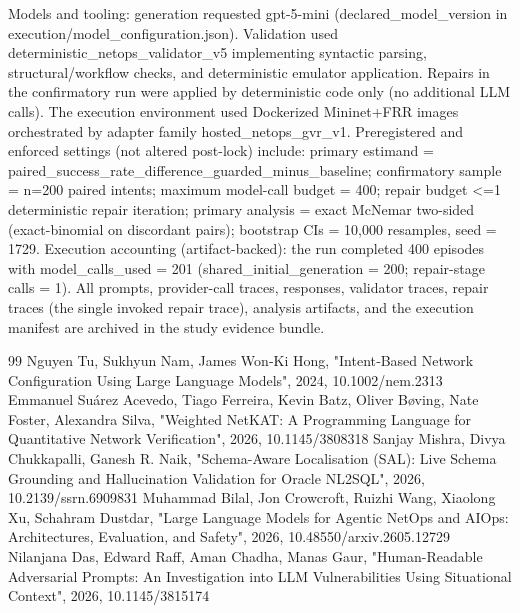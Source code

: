 \documentclass[conference]{IEEEtran}
\begin{document}
Models and tooling: generation requested gpt-5-mini (declared\_model\_version in execution/model\_configuration.json). Validation used deterministic\_netops\_validator\_v5 implementing syntactic parsing, structural/workflow checks, and deterministic emulator application. Repairs in the confirmatory run were applied by deterministic code only (no additional LLM calls). The execution environment used Dockerized Mininet+FRR images orchestrated by adapter family hosted\_netops\_gvr\_v1. Preregistered and enforced settings (not altered post-lock) include: primary estimand = paired\_success\_rate\_difference\_guarded\_minus\_baseline; confirmatory sample = n=200 paired intents; maximum model-call budget = 400; repair budget <=1 deterministic repair iteration; primary analysis = exact McNemar two-sided (exact-binomial on discordant pairs); bootstrap CIs = 10,000 resamples, seed = 1729. Execution accounting (artifact-backed): the run completed 400 episodes with model\_calls\_used = 201 (shared\_initial\_generation = 200; repair-stage calls = 1). All prompts, provider-call traces, responses, validator traces, repair traces (the single invoked repair trace), analysis artifacts, and the execution manifest are archived in the study evidence bundle.

\begin{thebibliography}{99}
 Nguyen Tu, Sukhyun Nam, James Won‐Ki Hong, "Intent‐Based Network Configuration Using Large Language Models", 2024, 10.1002/nem.2313
 Emmanuel Suárez Acevedo, Tiago Ferreira, Kevin Batz, Oliver Bøving, Nate Foster, Alexandra Silva, "Weighted NetKAT: A Programming Language for Quantitative Network Verification", 2026, 10.1145/3808318
 Sanjay Mishra, Divya Chukkapalli, Ganesh R. Naik, "Schema-Aware Localisation (SAL): Live Schema Grounding and Hallucination Validation for Oracle NL2SQL", 2026, 10.2139/ssrn.6909831
 Muhammad Bilal, Jon Crowcroft, Ruizhi Wang, Xiaolong Xu, Schahram Dustdar, "Large Language Models for Agentic NetOps and AIOps: Architectures, Evaluation, and Safety", 2026, 10.48550/arxiv.2605.12729
 Nilanjana Das, Edward Raff, Aman Chadha, Manas Gaur, "Human-Readable Adversarial Prompts: An Investigation into LLM Vulnerabilities Using Situational Context", 2026, 10.1145/3815174
\end{thebibliography}
\end{document}
